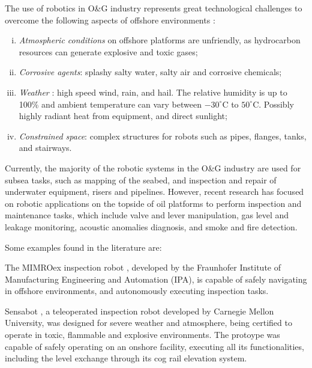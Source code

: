 \documentclass{ifacconf}
\begin{document}
The use of robotics in O\&G industry represents great technological challenges
to overcome the following aspects of offshore environments \citep{chen}:

\begin{enumerate}[i)]
\item \emph{Atmospheric conditions} on offshore platforms are unfriendly, as
hydrocarbon resources can generate explosive and toxic gases;
\item \emph{Corrosive agents}: splashy salty water, salty air and corrosive
chemicals;
\item \emph{Weather} : high speed wind, rain, and hail. The relative humidity is
up to 100\% and ambient temperature can vary between $-30^{\circ}$C to
$50^{\circ}$C. Possibly highly radiant heat from equipment, and direct sunlight;
\item \emph{Constrained space}: complex structures for robots such as pipes,
flanges, tanks, and stairways.
\end{enumerate}

Currently, the majority of the robotic systems in the O\&G industry are used for
subsea tasks, such as mapping of the seabed, and inspection and repair of
underwater equipment, risers and pipelines. However, recent research has focused
on robotic applications on the topside of oil platforms to perform inspection
and maintenance tasks, which include valve and lever manipulation, gas level
and leakage monitoring, acoustic anomalies diagnosis, and smoke and fire
detection.

Some examples found in the literature are:

The MIMROex inspection robot \citep{mimroex}, developed by the Fraunhofer
Institute of Manufacturing Engineering and Automation (IPA), is capable of
safely navigating in offshore environments, and autonomously executing
inspection tasks.

Sensabot \citep{sensabot}, a teleoperated inspection robot developed by
Carnegie Mellon University, was designed for severe weather and atmosphere,
being certified to operate in toxic, flammable and explosive environments. The
protoype was capable of safely operating on an onshore facility, executing all
its functionalities, including the level exchange through its cog rail
elevation system.
\end{document}
